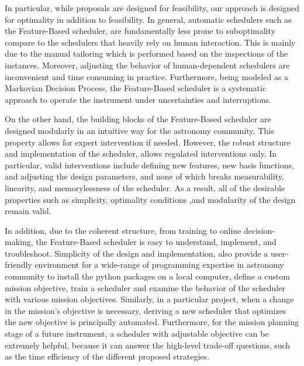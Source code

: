 \documentclass[12pt]{aastex62}
\theoremstyle{definition}
\begin{document}
In particular, while proposals are designed for feasibility, our approach is designed for optimality in addition to feasibility. In general, automatic schedulers such as the Feature-Based scheduler, are fundamentally less prone to suboptimality compare to the schedulers that heavily rely on human interaction. This is mainly due to the manual tailoring which is performed based on the inspections of the instances. Moreover, adjusting the behavior of human-dependent schedulers are inconvenient and time consuming in practice. Furthermore, being modeled as a Markovian Decision Process, the Feature-Based scheduler is a systematic approach to operate the instrument under uncertainties and interruptions.

On the other hand, the building blocks of the Feature-Based scheduler are designed modularly in an intuitive way for the astronomy community. This property allows for expert intervention if needed. However, the robust structure and implementation of the scheduler, allows regulated interventions only. In particular, valid interventions include defining new features, new basis functions, and adjusting the design parameters, and none of which breaks measurability, linearity, and memorylessness of the scheduler. As a result, all of the desirable properties such as simplicity, optimality conditions ,and modularity of the design remain valid. 

In addition, due to the coherent structure, from training to online decision-making, the Feature-Based scheduler is easy to understand, implement, and troubleshoot. Simplicity of the design and implementation, also provide a user-friendly environment for a wide-range of programming expertise in astronomy community to install the python packages on a local computer, define a custom mission objective, train a scheduler and examine the behavior of the scheduler with various mission objectives. Similarly, in a particular project, when a change in the mission's objective is necessary, deriving a new scheduler that optimizes the new objective is principally automated. Furthermore, for the mission planning stage of a future instrument, a scheduler with adjustable objective can be extremely helpful, because it can answer the high-level trade-off questions, such as the time efficiency of the different proposed strategies.
\end{document}
